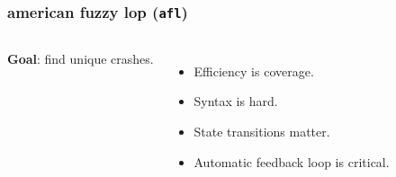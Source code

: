 \begin{frame}
\frametitle{american fuzzy lop (\texttt{afl})}

\begin{columns}[c]


\textbf{Goal}: find unique crashes.

\begin{itemize}
    \item Efficiency is coverage.
    \item Syntax is hard.
    \item State transitions matter.
    \item Automatic feedback loop is critical.
\end{itemize}

\end{columns}

\end{frame}
